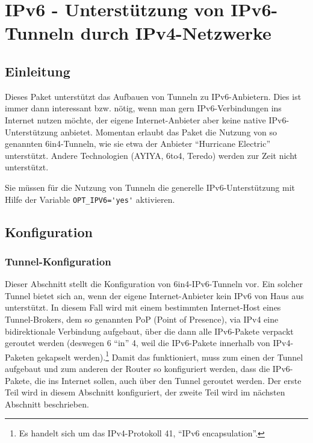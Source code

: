 \section{IPv6 - Unterstützung von IPv6-Tunneln durch IPv4-Netzwerke}

\subsection{Einleitung}

Dieses Paket unterstützt das Aufbauen von Tunneln zu IPv6-Anbietern. Dies ist
immer dann interessant bzw. nötig, wenn man gern IPv6-Verbindungen ins Internet
nutzen möchte, der eigene Internet-Anbieter aber keine native IPv6-Unterstützung
anbietet. Momentan erlaubt das Paket die Nutzung von so genannten 6in4-Tunneln,
wie sie etwa der Anbieter ``Hurricane Electric'' unterstützt. Andere
Technologien (AYIYA, 6to4, Teredo) werden zur Zeit nicht unterstützt.

Sie müssen für die Nutzung von Tunneln die generelle IPv6-Unterstützung mit
Hilfe der Variable \verb+OPT_IPV6='yes'+ aktivieren.

\subsection{Konfiguration}

\subsubsection{Tunnel-Konfiguration}


Dieser Abschnitt stellt die Konfiguration von 6in4-IPv6-Tunneln vor. Ein
solcher Tunnel bietet sich an, wenn der eigene Internet-Anbieter kein IPv6
von Haus aus unterstützt. In diesem Fall wird mit einem bestimmten
Internet-Host eines Tunnel-Brokers, dem so genannten PoP (Point of Presence),
via IPv4 eine bidirektionale Verbindung aufgebaut, über die dann alle
IPv6-Pakete verpackt geroutet werden (deswegen 6 ``in'' 4, weil die
IPv6-Pakete innerhalb von IPv4-Paketen gekapselt werden).\footnote{Es handelt
sich um das IPv4-Protokoll 41, ``IPv6 encapsulation''.} Damit das funktioniert,
muss zum einen der Tunnel aufgebaut und zum anderen der Router so konfiguriert
werden, dass die IPv6-Pakete, die ins Internet sollen, auch über den Tunnel
geroutet werden. Der erste Teil wird in diesem Abschnitt konfiguriert, der
zweite Teil wird im nächsten Abschnitt beschrieben.

